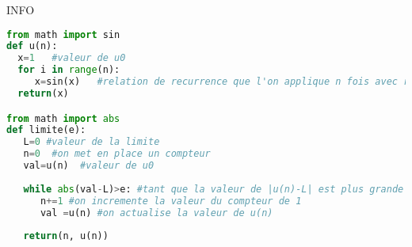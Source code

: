 \begin{correction}
\begin{enumerate}
\end{enumerate}

INFO


\begin{lstlisting}[language =Python]
from math import sin
def u(n):
  x=1	#valeur de u0
  for i in range(n):
     x=sin(x) 	#relation de recurrence que l'on applique n fois avec range(n)
  return(x)

from math import abs
def limite(e):
   L=0 #valeur de la limite
   n=0  #on met en place un compteur
   val=u(n)  #valeur de u0 
 
   while abs(val-L)>e: #tant que la valeur de |u(n)-L| est plus grande que e
      n+=1 #on incremente la valeur du compteur de 1 
      val =u(n) #on actualise la valeur de u(n)
      
   return(n, u(n))
\end{lstlisting}



\end{correction}